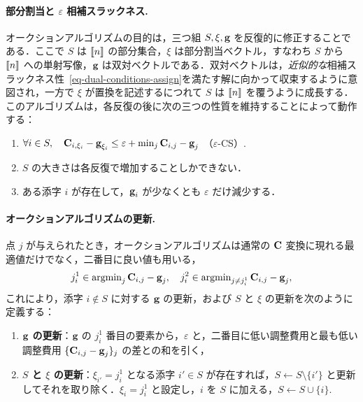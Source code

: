 \paragraph{部分割当と $\varepsilon$ 相補スラックネス.} オークションアルゴリズムの目的は，三つ組 $S,\xi,\mathrm{\textbf{g}}$ を反復的に修正することである．ここで $S$ は $\llbracket n\rrbracket$ の部分集合，$\xi$ は部分割当ベクトル，すなわち $S$ から $\llbracket n\rrbracket$ への単射写像，$\mathrm{\textbf{g}}$ は双対ベクトルである．双対ベクトルは，\emph{近似的な}相補スラックネス性~\eqref{eq-dual-conditions-assign}を満たす解に向かって収束するように意図され，一方で $\xi$ が置換を記述するにつれて $S$ は $\llbracket n\rrbracket$ を覆うように成長する．このアルゴリズムは，各反復の後に次の三つの性質を維持することによって動作する：
\begin{enumerate}[label={(\alph*)}]
	\item $\forall i\in S,\quad \mathrm{\textbf{C}}_{i,\xi_i} - \mathrm{\textbf{g}}_{\xi_i}  \leq \varepsilon + \min_{j} \mathrm{\textbf{C}}_{i,j} - \mathrm{\textbf{g}}_{j}$ （$\varepsilon$-CS）.
	\item $S$ の大きさは各反復で増加することしかできない．
	\item ある添字 $i$ が存在して，$\mathrm{\textbf{g}}_i$ が少なくとも $\varepsilon$ だけ減少する．
\end{enumerate}

\paragraph{オークションアルゴリズムの更新.} 点 $j$ が与えられたとき，オークションアルゴリズムは通常の $\mathrm{\textbf{C}}$ 変換に現れる最適値だけでなく，二番目に良い値も用いる，
$$j^1_i \in \operatorname{argmin}_{j} \mathrm{\textbf{C}}_{i,j} - \mathrm{\textbf{g}}_{j}, \quad j^2_i \in \operatorname{argmin}_{j\ne j^1_i} \mathrm{\textbf{C}}_{i,j} - \mathrm{\textbf{g}}_{j}, $$
これにより，添字 $i\notin S$ に対する $\mathrm{\textbf{g}}$ の更新，および $S$ と $\xi$ の更新を次のように定義する：
\begin{enumerate}\item \textbf{$\mathrm{\textbf{g}}$ の更新}：$\mathrm{\textbf{g}}$ の $j^1_i$ 番目の要素から，$\varepsilon$ と，二番目に低い調整費用と最も低い調整費用 $\{\mathrm{\textbf{C}}_{i,j}-\mathrm{\textbf{g}}_j\}_j$ の差との和を引く，
\item \textbf{$S$ と $\xi$ の更新}：$\xi_{i'}=j^1_{i}$ となる添字 $i'\in S$ が存在すれば，$S\leftarrow S\setminus \{i'\}$ と更新してそれを取り除く．$\xi_{i}=j^1_{i}$ と設定し，$i$ を $S$ に加える，$S\leftarrow S \cup \{i\}.$
\end{enumerate}

